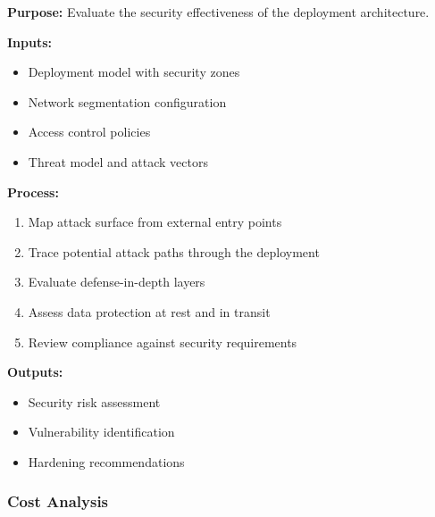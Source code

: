 \documentclass[11pt,letterpaper]{article}
\begin{document}
\begin{definitionbox}
\textbf{Purpose:} Evaluate the security effectiveness of the deployment architecture.

\textbf{Inputs:}
\begin{itemize}[nosep]
    \item Deployment model with security zones
    \item Network segmentation configuration
    \item Access control policies
    \item Threat model and attack vectors
\end{itemize}

\textbf{Process:}
\begin{enumerate}[nosep]
    \item Map attack surface from external entry points
    \item Trace potential attack paths through the deployment
    \item Evaluate defense-in-depth layers
    \item Assess data protection at rest and in transit
    \item Review compliance against security requirements
\end{enumerate}

\textbf{Outputs:}
\begin{itemize}[nosep]
    \item Security risk assessment
    \item Vulnerability identification
    \item Hardening recommendations
\end{itemize}
\end{definitionbox}

\subsubsection{Cost Analysis}
\end{document}
